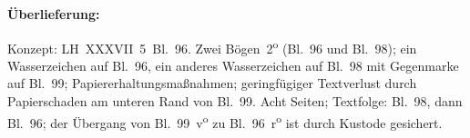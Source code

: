 %  
%
%
%
\frenchspacing
%
\begin{ledgroupsized}[r]{120mm}
\footnotesize
%
\pstart
\noindent\textbf{Überlieferung:}
\pend
%
\end{ledgroupsized}
%
\begin{ledgroupsized}[r]{114mm}
\footnotesize
\pstart \parindent -6mm
%
Konzept:
LH~XXXVII~5~Bl.~96.
Zwei Bögen~2\textsuperscript{o} (Bl.~96 und Bl.~98);
ein Wasserzeichen auf Bl.~96, ein anderes Wasserzeichen auf Bl.~98 mit Gegenmarke auf Bl.~99;
Papiererhaltungsmaßnahmen;
geringfügiger Textverlust durch Papierschaden am unteren Rand von Bl.~99.
Acht Seiten;
Textfolge: Bl.~98, dann Bl.~96;
der Übergang von Bl.~99~v\textsuperscript{o} zu Bl.~96~r\textsuperscript{o} ist durch Kustode gesichert.
\pend
%
\end{ledgroupsized}
%
\frenchspacing
%
\vspace{5mm}
